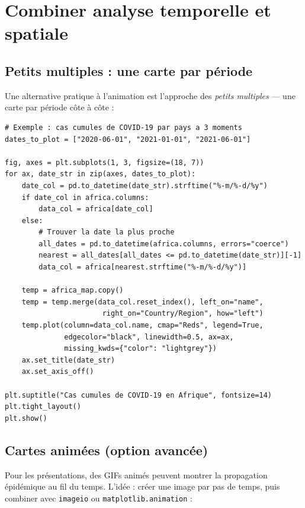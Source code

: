\section{Combiner analyse temporelle et spatiale}

\subsection{Petits multiples : une carte par p\'eriode}

Une alternative pratique \`a l'animation est l'approche des \emph{petits multiples} --- une carte par p\'eriode c\^ote \`a c\^ote :

\begin{verbatim}
# Exemple : cas cumules de COVID-19 par pays a 3 moments
dates_to_plot = ["2020-06-01", "2021-01-01", "2021-06-01"]

fig, axes = plt.subplots(1, 3, figsize=(18, 7))
for ax, date_str in zip(axes, dates_to_plot):
    date_col = pd.to_datetime(date_str).strftime("%-m/%-d/%y")
    if date_col in africa.columns:
        data_col = africa[date_col]
    else:
        # Trouver la date la plus proche
        all_dates = pd.to_datetime(africa.columns, errors="coerce")
        nearest = all_dates[all_dates <= pd.to_datetime(date_str)][-1]
        data_col = africa[nearest.strftime("%-m/%-d/%y")]

    temp = africa_map.copy()
    temp = temp.merge(data_col.reset_index(), left_on="name",
                       right_on="Country/Region", how="left")
    temp.plot(column=data_col.name, cmap="Reds", legend=True,
              edgecolor="black", linewidth=0.5, ax=ax,
              missing_kwds={"color": "lightgrey"})
    ax.set_title(date_str)
    ax.set_axis_off()

plt.suptitle("Cas cumules de COVID-19 en Afrique", fontsize=14)
plt.tight_layout()
plt.show()
\end{verbatim}

\subsection{Cartes anim\'ees (option avanc\'ee)}

Pour les pr\'esentations, des GIFs anim\'es peuvent montrer la propagation \'epid\'emique au fil du temps. L'id\'ee : cr\'eer une image par pas de temps, puis combiner avec \texttt{imageio} ou \texttt{matplotlib.animation} :

